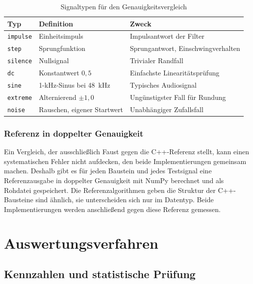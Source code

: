 \begin{table}[htb]
\centering
\small
\caption{Signaltypen für den Genauigkeitsvergleich}
\label{tab:signale}
\begin{tabularx}{\textwidth}{@{} l l X @{}}
	\toprule
	\textbf{Typ} & \textbf{Definition} & \textbf{Zweck} \\
	\midrule
	\texttt{impulse} & Einheitsimpuls              & Impulsantwort der Filter \\
	\texttt{step}    & Sprungfunktion              & Sprungantwort, Einschwingverhalten \\
	\texttt{silence} & Nullsignal                  & Trivialer Randfall \\
	\texttt{dc}      & Konstantwert $0{,}5$        & Einfachste Linearitätsprüfung \\
	\texttt{sine}    & 1-kHz-Sinus bei 48~kHz      & Typisches Audiosignal \\
	\texttt{extreme} & Alternierend $\pm 1{,}0$    & Ungünstigster Fall für Rundung \\
	\texttt{noise}   & Rauschen, eigener Startwert & Unabhängiger Zufallsfall \\
	\bottomrule
\end{tabularx}
\end{table}

\subsubsection*{Referenz in doppelter Genauigkeit}

Ein Vergleich, der ausschließlich Faust gegen die C++-Referenz stellt, kann
einen systematischen Fehler nicht aufdecken, den beide Implementierungen
gemeinsam machen. Deshalb gibt es für jeden Baustein und jedes
Testsignal eine Referenzausgabe in doppelter Genauigkeit mit NumPy berechnet
und als Rohdatei gespeichert. Die Referenzalgorithmen geben die Struktur der
C++-Bausteine sind ähnlich, sie unterscheiden sich nur im Datentyp.
Beide Implementierungen werden anschließend gegen
diese Referenz gemessen.

\section{Auswertungsverfahren}
\label{sec:auswertung}

\subsection{Kennzahlen und statistische Prüfung}

